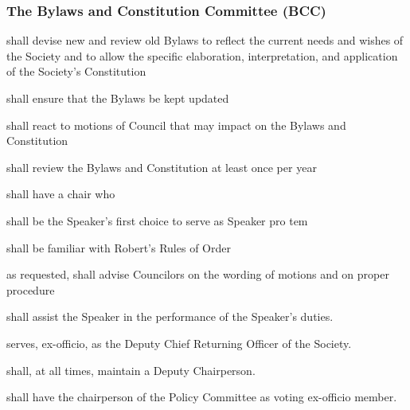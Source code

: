 \subsubsection{The Bylaws and Constitution Committee (BCC)}
\begin{longenum}[ label*=\thesubsubsection.\arabic*., align=left]
	\item shall devise new and review old Bylaws to reflect the current needs and wishes of the Society and to allow the specific elaboration, interpretation, and application of the Society's Constitution 
    \item shall ensure that the Bylaws be kept updated
    \item shall react to motions of Council that may impact on the Bylaws and Constitution
    \item shall review the Bylaws and Constitution at least once per year
    \item shall have a chair who
    \begin{longenum}[ label*=\arabic*., align=left]
		\item shall be the Speaker's first choice to serve as Speaker pro tem
        \item shall be familiar with Robert's Rules of Order
        \item as requested, shall advise Councilors on the wording of motions and on proper procedure
        \item shall assist the Speaker in the performance of the Speaker's duties.
        \item serves, ex-officio, as the Deputy Chief Returning Officer of the Society.
        \end{longenum}
    \item shall, at all times, maintain a Deputy Chairperson.
    \item shall have the chairperson of the Policy Committee as voting ex-officio member.
\end{longenum}


